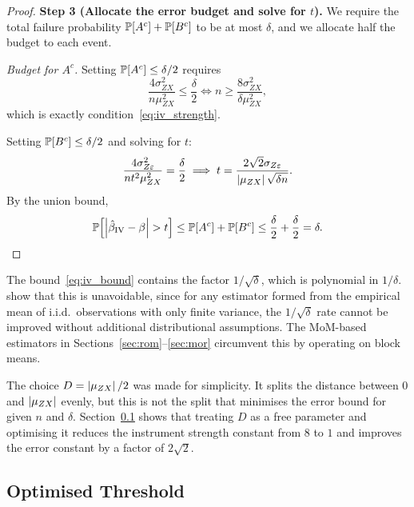 \begin{proof}
    \medskip\noindent\textbf{Step 3 (Allocate the error budget and solve for $t$).}
    We require the total failure probability $\operatorname{\mathbb{P}}[A^c]+\operatorname{\mathbb{P}}[B^c]$ to be at most $\delta$, and we allocate half the budget to each event.

    \emph{Budget for $A^c$.}
    Setting $\operatorname{\mathbb{P}}[A^c]\leq\delta/2$ requires
    \[
        \frac{4\sigma_{ZX}^2}{n\mu_{ZX}^2} \leq \frac{\delta}{2}
        \iff
        n \geq \frac{8\sigma_{ZX}^2}{\delta\mu_{ZX}^2},
    \]
    which is exactly condition~\eqref{eq:iv_strength}.

    Setting $\operatorname{\mathbb{P}}[B^c]\leq\delta/2$ and solving for $t$:
    \[
        \frac{4\sigma_{Z\varepsilon}^2}{nt^2\mu_{ZX}^2} = \frac{\delta}{2} \implies t = \frac{2\sqrt{2}\sigma_{Z\varepsilon}}{\left|\mu_{ZX}\right|\sqrt{\delta n}}.
    \]
    By the union bound,
    \[
        \operatorname{\mathbb{P}}\!\left[\left|\hat{\beta}_{\mathrm{IV}}-\beta\right| > t\right] \leq \operatorname{\mathbb{P}}[A^c] + \operatorname{\mathbb{P}}[B^c] \leq \frac{\delta}{2} + \frac{\delta}{2} = \delta. \qedhere
    \]
\end{proof}

\begin{remark}
\label{rem:iv_polynomial}
    The bound~\eqref{eq:iv_bound} contains the factor $1/\sqrt{\delta}$, which is polynomial in $1/\delta$. \citet{catoni2012challenging} show that this is unavoidable, since for any estimator formed from the empirical mean of i.i.d.\ observations with only finite variance, the $1/\sqrt{\delta}$ rate cannot be improved without additional distributional assumptions. The MoM-based estimators in Sections~\ref{sec:rom}--\ref{sec:mor} circumvent this by operating on block means.
\end{remark}

\begin{remark}
\label{rem:iv_D_choice}
    The choice $D = \left|\mu_{ZX}\right|/2$ was made for simplicity. It splits the distance between $0$ and $\left|\mu_{ZX}\right|$ evenly, but this is not the split that minimises the error bound for given $n$ and $\delta$. Section~\ref{sec:iv_optimised} shows that treating $D$ as a free parameter and optimising it reduces the instrument strength constant from $8$ to $1$ and improves the error constant by a factor
    of $2\sqrt{2}$.
\end{remark}


\subsection{Optimised Threshold}
\label{sec:iv_optimised}

